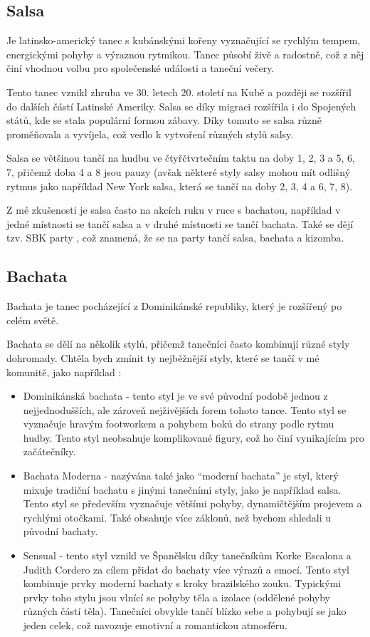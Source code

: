 \subsection{Salsa}
Je latinsko-americký tanec s kubánskými kořeny vyznačující se rychlým tempem, energickými pohyby a výraznou rytmikou. Tanec působí živě a radostně, což z něj činí vhodnou volbu pro společenské události a taneční večery. \cite{socialDance:salsa}

Tento tanec vznikl zhruba ve 30. letech 20. století na Kubě a později se rozšířil do dalších částí Latinské Ameriky. Salsa se díky migraci rozšířila i do Spojených států, kde se stala populární formou zábavy. Díky tomuto se salsa různě proměňovala a vyvíjela, což vedlo k vytvoření různých stylů salsy. \cite{socialDance:salsa:history}

Salsa se většinou tančí na hudbu ve čtyřčtvrtečním taktu na doby 1, 2, 3 a 5, 6, 7, přičemž doba 4 a 8 jsou pauzy (avšak některé styly salsy mohou mít odlišný rytmus jako například New York salsa, která se tančí na doby 2, 3, 4 a 6, 7, 8). \cite{socialDance:salsa:rhythm}

Z mé zkušenosti je salsa často na akcích ruku v ruce s bachatou, například v jedné místnosti se tančí salsa a v druhé místnosti se tančí bachata. Také se dějí tzv. SBK party \cite{sbk90_danses}, což znamená, že se na party tančí salsa, bachata a kizomba. 

\subsection{Bachata}
Bachata je tanec pocházející z Dominikánské republiky, který je rozšířený po celém světě. 
\cite{incognitodance_what_is_bachata}

Bachata se dělí na několik stylů, přičemž tanečníci často kombinují různé styly dohromady. Chtěla bych zmínit ty nejběžnější styly, které se tančí v mé komunitě, jako například \cite{jtdancestudio_bachata_styles}:
\begin{itemize}
    \item Dominikánská bachata - tento styl je ve své původní podobě jednou z nejjednodušších, ale zároveň nejživějších forem tohoto tance. Tento styl se vyznačuje hravým footworkem a pohybem boků do strany podle rytmu hudby. Tento styl neobsahuje komplikované figury, což ho činí vynikajícím pro začátečníky.
    \item Bachata Moderna - nazývána také jako ``moderní bachata'' je styl, který mixuje tradiční bachatu s jinými tanečními styly, jako je například salsa. Tento styl se především vyznačuje většími pohyby, dynamičtějším projevem a rychlými otočkami. Také obsahuje více záklonů, než bychom shledali u původní bachaty.
    \item Sensual - tento styl vznikl ve Španělsku díky tanečníkům Korke Escalona a Judith Cordero za cílem přidat do bachaty více výrazů a emocí. Tento styl kombinuje prvky moderní bachaty s kroky brazilského zouku. Typickými prvky toho stylu jsou vlnící se pohyby těla a izolace (oddělené pohyby různých částí těla). Tanečníci obvykle tančí blízko sebe a pohybují se jako jeden celek, což navozuje emotivní a romantickou atmosféru.
\end{itemize}

